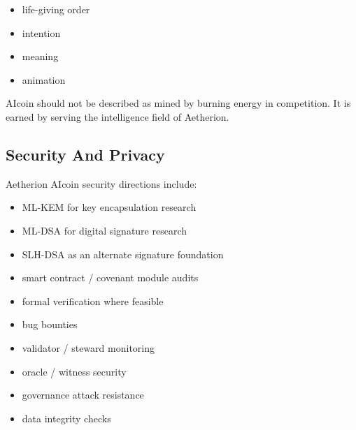 ﻿\documentclass[12pt]{article}
\begin{document}
\begin{itemize}
  \item life-giving order
\end{itemize}
\begin{itemize}
  \item intention
\end{itemize}
\begin{itemize}
  \item meaning
\end{itemize}
\begin{itemize}
  \item animation
\end{itemize}

AIcoin should not be described as mined by burning energy in competition. It is earned by serving the intelligence field of Aetherion.

\subsection{Security And Privacy}


Aetherion AIcoin security directions include:

\begin{itemize}
  \item ML-KEM for key encapsulation research
\end{itemize}
\begin{itemize}
  \item ML-DSA for digital signature research
\end{itemize}
\begin{itemize}
  \item SLH-DSA as an alternate signature foundation
\end{itemize}
\begin{itemize}
  \item smart contract / covenant module audits
\end{itemize}
\begin{itemize}
  \item formal verification where feasible
\end{itemize}
\begin{itemize}
  \item bug bounties
\end{itemize}
\begin{itemize}
  \item validator / steward monitoring
\end{itemize}
\begin{itemize}
  \item oracle / witness security
\end{itemize}
\begin{itemize}
  \item governance attack resistance
\end{itemize}
\begin{itemize}
  \item data integrity checks
\end{itemize}
\end{document}
